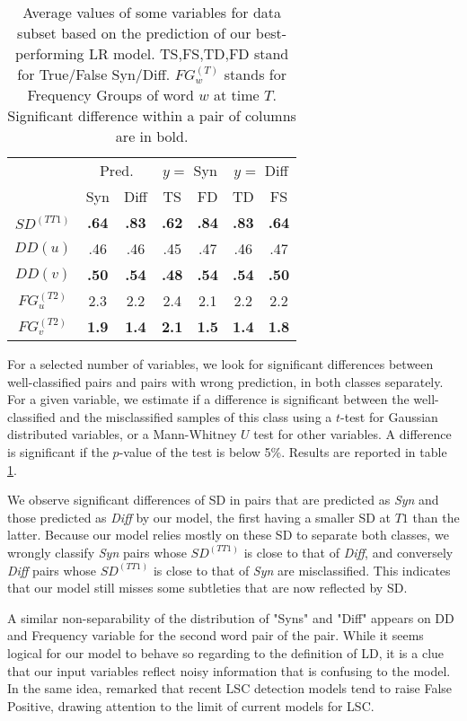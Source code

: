 \documentclass[11pt]{article}
\newcommand{\synOne}{u}%
\newcommand{\synTwo}{v}%
\newcommand{\firstTime}{T1}
\begin{document}
\begin{table}[ht]
    \centering
    \begin{tabular}{c||cc|cc|cc}\toprule
         & \multicolumn{2}{c|}{Pred.} & \multicolumn{2}{c|}{$y=$ Syn} & \multicolumn{2}{c}{$y=$ Diff} \\
         & Syn & Diff & TS & FD & TD & FS \\\cmidrule{1-7}
        $SD^{(T\firstTime)}$ & \textbf{.64} & \textbf{.83} & \textbf{.62} & \textbf{.84} & \textbf{.83} & \textbf{.64} \\
        $DD(\synOne)$ & .46 & .46 & .45 & .47 & .46 & .47 \\
        $DD(\synTwo)$ & \textbf{.50} & \textbf{.54} & \textbf{.48} & \textbf{.54} & \textbf{.54} & \textbf{.50} \\
        $FG^{(T2)}_\synOne$ & 2.3 & 2.2 & 2.4 & 2.1 & 2.2 & 2.2 \\
        $FG^{(T2)}_\synTwo$ & \textbf{1.9} & \textbf{1.4} & \textbf{2.1} & \textbf{1.5} & \textbf{1.4} & \textbf{1.8} \\
        
    \bottomrule
    \end{tabular}
    \caption{Average values of some variables for data subset based on the prediction of our best-performing LR model. TS,FS,TD,FD stand for True/False Syn/Diff. $FG_w^{(T)}$ stands for Frequency Groups of word $w$ at time $T$. Significant difference within a pair of columns are in bold.}
    \label{tab:comparisons}
\end{table}

For a selected number of variables, we look for significant differences between well-classified pairs and pairs with wrong prediction, in both classes separately. For a given variable, we estimate if a difference is significant between the well-classified and the misclassified samples of this class using a $t$-test for Gaussian distributed variables, or a Mann-Whitney $U$ test for other variables. A difference is significant if the $p$-value of the test is below 5\%. Results are reported in table \ref{tab:comparisons}. 

We observe significant differences of SD in pairs that are predicted as \textit{Syn} and those predicted as \textit{Diff} by our model, the first having a smaller SD at $T1$ than the latter. Because our model relies mostly on these SD to separate both classes, we wrongly classify \textit{Syn} pairs whose $SD^{(T\firstTime)}$ is close to that of \textit{Diff}, and conversely \textit{Diff} pairs whose $SD^{(T\firstTime)}$ is close to that of \textit{Syn} are misclassified. This indicates that our model still misses some subtleties that are now reflected by SD.

A similar non-separability of the distribution of "Syns" and "Diff" appears on DD and Frequency variable for the second word pair of the pair.
While it seems logical for our model to behave so regarding to the definition of LD, it is a clue that our input variables reflect noisy information that is confusing to the model. In the same idea, \citet{kutuzov-2022-contextualized} remarked that recent LSC detection models tend to raise False Positive, drawing attention to the limit of current models for LSC.
\end{document}
